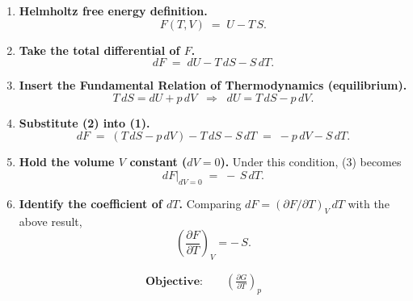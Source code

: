 \documentclass[12pt]{article}
\theoremstyle{definition} %
\theoremstyle{plain} %
\begin{document}
      \begin{enumerate}
      \item \textbf{Helmholtz free energy definition.}
            \[
              F(T,V) \;=\; U - T\,S .
            \]
      
      \item \textbf{Take the total differential of \(F\).}
            \[
              dF
              \;=\;
              dU - T\,dS - S\,dT .
              \tag{1}
            \]
      
      \item \textbf{Insert the Fundamental Relation of Thermodynamics (equilibrium).}
            \[
              T\,dS = dU + p\,dV
              \;\;\Longrightarrow\;\;
              dU = T\,dS - p\,dV .
              \tag{2}
            \]
      
      \item \textbf{Substitute (2) into (1).}
            \[
              dF
              \;=\;
              (T\,dS - p\,dV) - T\,dS - S\,dT
              \;=\;
              -p\,dV - S\,dT .
              \tag{3}
            \]
      
      \item \textbf{Hold the volume \(V\) constant (\(dV = 0\)).}
            Under this condition, (3) becomes
            \[
              dF\big|_{dV = 0} \;=\; -\,S\,dT .
            \]
      
      \item \textbf{Identify the coefficient of \(dT\).}
            Comparing \(dF = (\partial F/\partial T)_V\,dT\) with the above result,
            \[
              \boxed{\displaystyle
                \left(\frac{\partial F}{\partial T}\right)_V = -\,S } .
            \]
      \end{enumerate}
      \begin{align*}
        \textbf{Objective:}\qquad
        \left(\frac{\partial G}{\partial T}\right)_p
        \end{align*}
        
\end{document}
